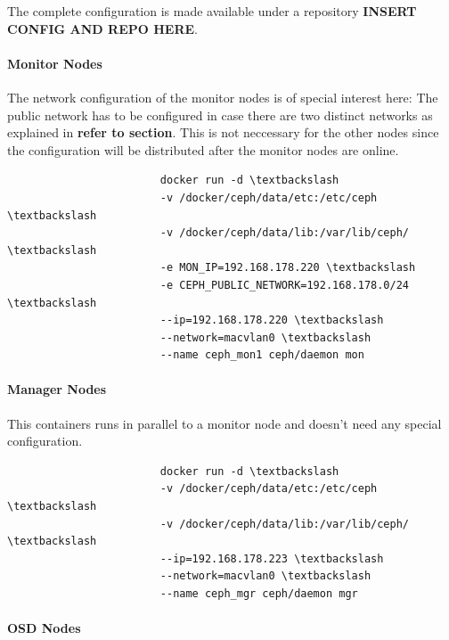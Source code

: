 \documentclass[titlepage, a4paper, 11pt]{scrartcl}
\begin{document}
                The complete configuration is made available under a repository \textbf{INSERT CONFIG AND REPO HERE}.

                \paragraph{Monitor Nodes}

                    The network configuration of the monitor nodes is of special interest here: The public network has to be configured in case there are two 
                    distinct networks as explained in \textbf{refer to section}. This is not neccessary for the other nodes since the configuration will be distributed
                    after the monitor nodes are online.

                    \begin{lstlisting}
                        docker run -d \textbackslash
                        -v /docker/ceph/data/etc:/etc/ceph \textbackslash
                        -v /docker/ceph/data/lib:/var/lib/ceph/ \textbackslash
                        -e MON_IP=192.168.178.220 \textbackslash
                        -e CEPH_PUBLIC_NETWORK=192.168.178.0/24 \textbackslash
                        --ip=192.168.178.220 \textbackslash
                        --network=macvlan0 \textbackslash
                        --name ceph_mon1 ceph/daemon mon                        
                    \end{lstlisting}

                \paragraph{Manager Nodes}

                    This containers runs in parallel to a monitor node and doesn't need any special configuration.

                    \begin{lstlisting}                    
                        docker run -d \textbackslash
                        -v /docker/ceph/data/etc:/etc/ceph \textbackslash
                        -v /docker/ceph/data/lib:/var/lib/ceph/ \textbackslash
                        --ip=192.168.178.223 \textbackslash
                        --network=macvlan0 \textbackslash
                        --name ceph_mgr ceph/daemon mgr
                    \end{lstlisting}

                \paragraph{OSD Nodes}
\end{document}
